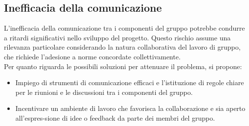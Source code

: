 \documentclass{article}
\begin{document}
\subsection{Inefficacia della comunicazione} 
L’inefficacia della comunicazione tra i componenti del gruppo potrebbe condurre a ritardi significativi nello sviluppo del progetto. Questo rischio assume una rilevanza particolare considerando la natura collaborativa del lavoro di gruppo, che richiede l’adesione a norme concordate collettivamente.
\\Per quanto riguarda le possibili soluzioni per attenuare il problema, si propone:
   \begin{itemize} 
    \item Impiego di strumenti di comunicazione efficaci e l’istituzione di regole chiare per le riunioni e le discussioni tra i componenti del gruppo.
    \item Incentivare un ambiente di lavoro che favorisca la collaborazione e sia aperto all'espres-sione di idee o feedback da parte dei membri del gruppo.
\end{itemize}
\end{document}
